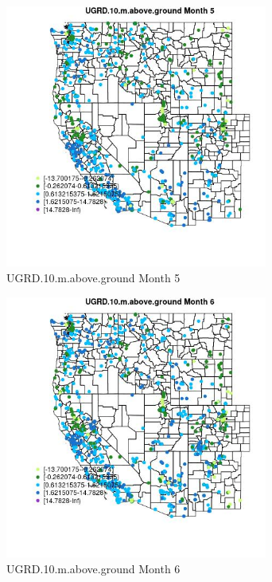 \begin{figure} 
\centering  
\includegraphics[width=0.77\textwidth]{Code_Outputs/Report_ML_input_PM25_Step4_part_f_de_duplicated_aves_prioritize_24hr_obswNAs_MapObsMo5UGRD10maboveground.jpg} 
\caption{\label{fig:Report_ML_input_PM25_Step4_part_f_de_duplicated_aves_prioritize_24hr_obswNAsMapObsMo5UGRD10maboveground}UGRD.10.m.above.ground Month 5} 
\end{figure} 
 

\clearpage 

\begin{figure} 
\centering  
\includegraphics[width=0.77\textwidth]{Code_Outputs/Report_ML_input_PM25_Step4_part_f_de_duplicated_aves_prioritize_24hr_obswNAs_MapObsMo6UGRD10maboveground.jpg} 
\caption{\label{fig:Report_ML_input_PM25_Step4_part_f_de_duplicated_aves_prioritize_24hr_obswNAsMapObsMo6UGRD10maboveground}UGRD.10.m.above.ground Month 6} 
\end{figure} 
 

